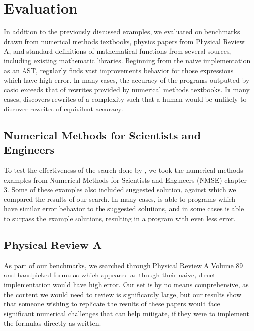 \documentclass[paper.tex]{subfiles}
\begin{document}
\section{Evaluation}
\label{sec:evaluation}


In addition to the previously discussed examples,
we evaluated \casio on benchmarks drawn from
numerical methods textbooks,
physics papers from Physical Review A,
and standard definitions of mathematical functions from several sources,
including existing mathematic libraries.
Beginning from the naive implementation as an AST,
\casio regularly finds vast improvements behavior for those expressions which have high error.
In many cases, the accuracy of the programs outputted by casio 
exceeds that of rewrites provided by numerical methods textbooks.
In many cases, \casio discovers rewrites of a complexity 
such that a human would be unlikely to discover rewrites of equivilent accuracy.

\subsection{Numerical Methods for Scientists and Engineers}

To test the effectiveness of the search done by \casio,
we took the numerical methods examples from
Numerical Methods for Scientists and Engineers (NMSE) chapter 3.
Some of these examples also included suggested solution,
against which we compared the results of our search.
In many cases, \casio is able to programs which have
similar error behavior to the suggested solutions,
and in some cases \casio is able to surpass the
example solutions, resulting in a program with even less error.

\subsection{Physical Review A}

As part of our benchmarks, we searched through Physical Review A Volume 89
and handpicked formulas which appeared as though
their naive, direct implementation would have high error.
Our set is by no means comprehensive,
as the content we would need to review is significantly large,
but our results show that someone wishing to replicate the results of these papers
would face significant numerical challenges that \casio can help mitigate,
if they were to implement the formulas directly as written.
\end{document}
